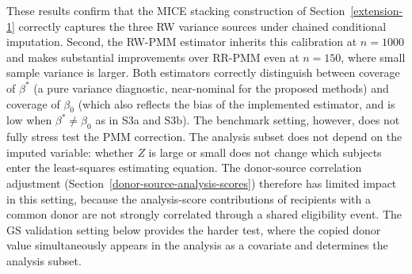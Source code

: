 These results confirm that the MICE stacking construction
of Section~\ref{extension-1}
correctly captures the three RW variance sources under chained conditional
imputation.  Second, the RW-PMM estimator inherits this
calibration at \(n=1000\) and makes substantial improvements over
RR-PMM even at \(n=150\), where small sample variance is larger.  Both
estimators correctly distinguish between coverage of \(\beta^\ast\) (a
pure variance diagnostic, near-nominal for the proposed methods) and
coverage of \(\beta_0\) (which also reflects the bias of the implemented
estimator, and is low when \(\beta^\ast \neq \beta_0\) as in S3a and S3b).
The benchmark setting, however, does not fully stress test the PMM
correction.  The analysis subset does not depend on the imputed variable:
whether \(Z\) is large or small does not change which subjects enter the
least-squares estimating equation.  The donor-source correlation
adjustment (Section~\ref{donor-source-analysis-scores}) therefore has
limited impact in this setting, because the analysis-score contributions
of recipients with a common donor are not strongly correlated through a
shared eligibility event.  The GS validation setting below provides the
harder test, where the copied donor value simultaneously appears in the
analysis as a covariate and determines the analysis subset.
\clearpage
